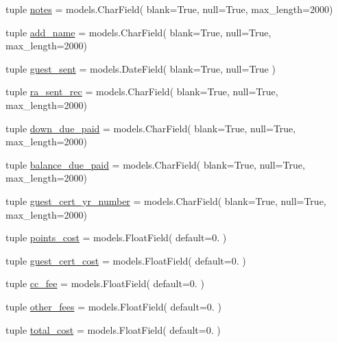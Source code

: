 \begin{DoxyCompactItemize}
\item 
tuple \hyperlink{namespaceguest__reservation__manager_1_1models_a9beda3157c594b7886c91873a67f444f}{notes} = models.\-Char\-Field( blank=True, null=True, max\-\_\-length=2000)
\item 
tuple \hyperlink{namespaceguest__reservation__manager_1_1models_abab7390bfd0d7ca086eb8aac69a612d9}{add\-\_\-name} = models.\-Char\-Field( blank=True, null=True, max\-\_\-length=2000)
\item 
tuple \hyperlink{namespaceguest__reservation__manager_1_1models_aef8c7a9b591a0e90990858eaa060a439}{guest\-\_\-sent} = models.\-Date\-Field( blank=True, null=True )
\item 
tuple \hyperlink{namespaceguest__reservation__manager_1_1models_a56af6e6bd58c3a361260e9fee430d403}{ra\-\_\-sent\-\_\-rec} = models.\-Char\-Field( blank=True, null=True, max\-\_\-length=2000)
\item 
tuple \hyperlink{namespaceguest__reservation__manager_1_1models_a097bc34e22cdc6a370c8eeb619db4f63}{down\-\_\-due\-\_\-paid} = models.\-Char\-Field( blank=True, null=True, max\-\_\-length=2000)
\item 
tuple \hyperlink{namespaceguest__reservation__manager_1_1models_a194b94d8c28faf0fbe5e6844c2e1c5e3}{balance\-\_\-due\-\_\-paid} = models.\-Char\-Field( blank=True, null=True, max\-\_\-length=2000)
\item 
tuple \hyperlink{namespaceguest__reservation__manager_1_1models_a476f6f9f9cf0fefbc2584d5316220d06}{guest\-\_\-cert\-\_\-yr\-\_\-number} = models.\-Char\-Field( blank=True, null=True, max\-\_\-length=2000)
\item 
tuple \hyperlink{namespaceguest__reservation__manager_1_1models_a1e31ad7cbb3612f6bff704e1f9929ac7}{points\-\_\-cost} = models.\-Float\-Field( default=0. )
\item 
tuple \hyperlink{namespaceguest__reservation__manager_1_1models_ae1993f4182f735b068bf110b1fc74215}{guest\-\_\-cert\-\_\-cost} = models.\-Float\-Field( default=0. )
\item 
tuple \hyperlink{namespaceguest__reservation__manager_1_1models_af437f3cc8a5d025cf3c2f2aca573ac86}{cc\-\_\-fee} = models.\-Float\-Field( default=0. )
\item 
tuple \hyperlink{namespaceguest__reservation__manager_1_1models_a6b16e65df2efd31483294d10f9be1b39}{other\-\_\-fees} = models.\-Float\-Field( default=0. )
\item 
tuple \hyperlink{namespaceguest__reservation__manager_1_1models_a6b33a5bec1060ff8750ffde85f75f2cf}{total\-\_\-cost} = models.\-Float\-Field( default=0. )

\end{DoxyCompactItemize}

